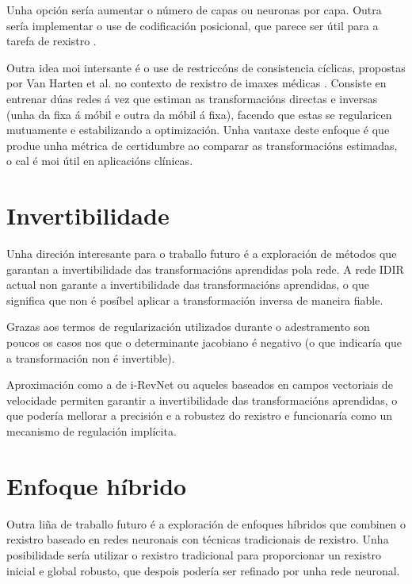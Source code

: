 Unha opción sería aumentar o número de capas ou neuronas por capa. Outra sería implementar o use de codificación posicional, que parece ser útil para a tarefa de rexistro \cite{mueller2022instant}.

Outra idea moi intersante é o use de restriccóns de consistencia cíclicas, propostas por Van Harten et al. no contexto de rexistro de imaxes médicas \cite{van_Harten_2024}. Consiste en entrenar dúas redes á vez que estiman as transformacións directas e inversas (unha da fixa á móbil e outra da móbil á fixa), facendo que estas se regularicen mutuamente e estabilizando a optimización.
Unha vantaxe deste enfoque é que produe unha métrica de certidumbre ao comparar as transformacións estimadas, o cal é moi útil en aplicacións clínicas.

\section{Invertibilidade}
\label{sec:Invertibilidade}

Unha direción interesante para o traballo futuro é a exploración de métodos que garantan a invertibilidade das transformacións aprendidas pola rede.
A rede IDIR actual non garante a invertibilidade das transformacións aprendidas, o que significa que non é posíbel aplicar a transformación inversa de maneira fiable.

Grazas aos termos de regularización utilizados durante o adestramento son poucos os casos nos que o determinante jacobiano é negativo (o que indicaría que a transformación non é invertible).

Aproximación como a de i-RevNet \cite{jacobsen2018irevnetdeepinvertiblenetworks} ou aqueles baseados en campos vectoriais de velocidade \cite{sun2024medicalimageregistrationneural} permiten garantir a invertibilidade das transformacións aprendidas, o que podería mellorar a precisión e a robustez do rexistro e funcionaría como un mecanismo de regulación implícita.

\section{Enfoque híbrido}
\label{sec:Enfoque híbrido}

Outra liña de traballo futuro é a exploración de enfoques híbridos que combinen o rexistro baseado en redes neuronais con técnicas tradicionais de rexistro.
Unha posibilidade sería utilizar o rexistro tradicional para proporcionar un rexistro inicial e global robusto, que despois podería ser refinado por unha rede neuronal.

